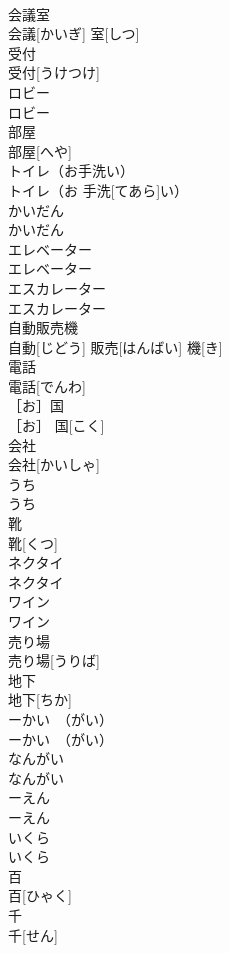 \documentclass[8pt]{extreport}
\begin{document}
\begin{CJK}{UTF8}{min}
\\	会議室	
\\	会議[かいぎ] 室[しつ]	
\\	受付	
\\	受付[うけつけ]	
\\	ロビー	
\\	ロビー	
\\	部屋	
\\	部屋[へや]	
\\	トイレ（お手洗い）	
\\	トイレ（お 手洗[てあら]い）	
\\	かいだん	
\\	かいだん	
\\	エレベーター	
\\	エレベーター	
\\	エスカレーター	
\\	エスカレーター	
\\	自動販売機	
\\	自動[じどう] 販売[はんばい] 機[き]	
\\	電話	
\\	電話[でんわ]	
\\	［お］国	
\\	［お］ 国[こく]	
\\	会社	
\\	会社[かいしゃ]	
\\	うち	
\\	うち	
\\	靴	
\\	靴[くつ]	
\\	ネクタイ	
\\	ネクタイ	
\\	ワイン	
\\	ワイン	
\\	売り場	
\\	売り場[うりば]	
\\	地下	
\\	地下[ちか]	
\\	ーかい　（がい）	
\\	ーかい　（がい）	
\\	なんがい	
\\	なんがい	
\\	ーえん	
\\	ーえん	
\\	いくら	
\\	いくら	
\\	百	
\\	百[ひゃく]	
\\	千	
\\	千[せん]	

\end{CJK}
\end{document}
